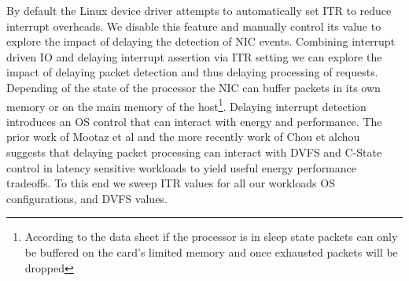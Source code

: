 By default the Linux device driver attempts to automatically set ITR to reduce interrupt overheads.  We disable this feature and manually control its value to explore the impact of delaying the detection of NIC events.  Combining interrupt driven IO and delaying interrupt assertion via ITR setting we can explore the impact of delaying packet detection and thus delaying processing of requests.  Depending of the state of the processor the NIC can buffer packets in its own memory or on the main memory of the host\footnote{According to the data sheet if the processor is in sleep state packets can only be buffered on the card's limited memory and once exhausted packets will be dropped}.  Delaying interrupt detection introduces an OS control that can interact with energy and performance.  The prior work of Mootaz et al\cite{mootaz} and the more recently work of Chou et al{chou} suggests that delaying packet processing can interact with DVFS and C-State control in latency sensitive workloads to yield useful energy performance tradeoffs. To this end we sweep ITR values for all our workloads OS configurations, and DVFS values.



%
%
%
%
